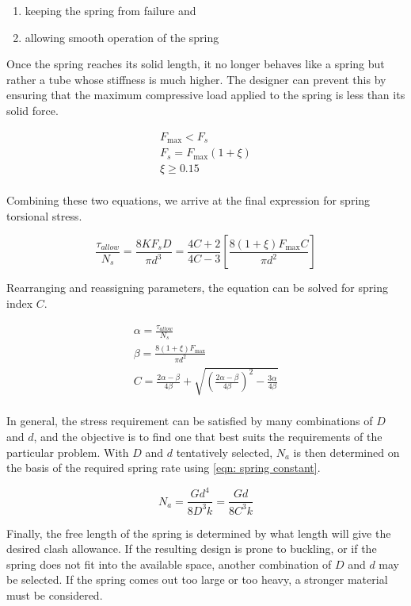 \documentclass[a4paper,openany,12pt]{book}
\begin{document}
{{\begin{enumerate}
\item keeping the spring from failure and

\item allowing smooth operation of the spring
\end{enumerate}

Once the spring reaches its solid length, it no longer behaves like a
spring but rather a tube whose stiffness is much higher. The designer
can prevent this by ensuring that the maximum compressive load applied
to the spring is less than its solid force.

$$\begin{gathered}
    F_{\max} < F_s \\ 
    F_s = F_{\max}(1 + \xi ) \\ 
    \xi  \geqslant 0.15 \\ 
  \end{gathered}$$

Combining these two equations, we arrive at the final expression for
spring torsional stress.

$$\frac{\tau _{allow}}{N_s} = \frac{8KF_sD}{\pi d^3} = \frac{4C + 2}{4C - 3}\left[ \frac{8(1 + \xi )F_{\max }C}{\pi d^2} \right]$$

Rearranging and reassigning parameters, the equation can be solved for
spring index \(C\).

$$\begin{gathered}
    \alpha  = \frac{\tau_{allow}}{N_s} \\ 
    \beta  = \frac{8(1 + \xi )F_{\max}}{\pi d^2} \\ 
    C = \frac{2\alpha  - \beta }{4\beta} + \sqrt {\left( \frac{2\alpha  - \beta}{4\beta} \right)^2 - \frac{3\alpha}{4\beta}}  \\ 
  \end{gathered}$$

In general, the stress requirement can be satisfied by many combinations
of \(D\) and \(d\), and the objective is to find one that best suits the
requirements of the particular problem. With \(D\) and \(d\) tentatively
selected, \(N_a\) is then determined on the basis of the required spring
rate using \ref{eqn: spring constant}.

$$N_a = \frac{Gd^4}{8D^3k} = \frac{Gd}{8C^3k}$$

Finally, the free length of the spring is determined by what length will
give the desired clash allowance. If the resulting design is prone to
buckling, or if the spring does not fit into the available space,
another combination of \(D\) and \(d\) may be selected. If the spring comes
out too large or too heavy, a stronger material must be considered.

}}
\end{document}

